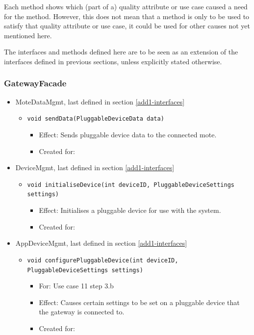     \noindent Each method shows which (part of a) quality attribute or use case caused
    a need for the method. However, this does not mean that a method is
    only to be used to satisfy that quality  attribute or use case, it could
    be used for other causes not yet mentioned here.

    \noindent The interfaces and methods defined here are to be seen as an
    extension of the interfaces defined in previous sections, unless
    explicitly stated otherwise.

    \subsubsection{GatewayFacade}
        \begin{itemize}
            \item MoteDataMgmt, last defined in section \ref{add1-interfaces}
            \begin{itemize}
                \item \texttt{void sendData(PluggableDeviceData data)}
                \begin{itemize}
                    \item Effect: Sends pluggable device data to the connected mote.
                    \item Created for:
                \end{itemize}
            \end{itemize}

            \item DeviceMgmt, last defined in section \ref{add1-interfaces}
            \begin{itemize}
                \item \texttt{void initialiseDevice(int deviceID, PluggableDeviceSettings settings)}
                \begin{itemize}
                    \item Effect: Initialises a pluggable device for use with the system.
                    \item Created for:
                \end{itemize}
            \end{itemize}

            \item AppDeviceMgmt, last defined in section \ref{add1-interfaces}
            \begin{itemize}
                \item \texttt{void configurePluggableDevice(int deviceID, PluggableDeviceSettings settings)}
                \begin{itemize}
                    \item For: Use case 11 step 3.b
                    \item Effect: Causes certain settings to be set on a pluggable
                          device that the gateway is connected to.
                    \item Created for:
                \end{itemize}
            \end{itemize}
        \end{itemize}

